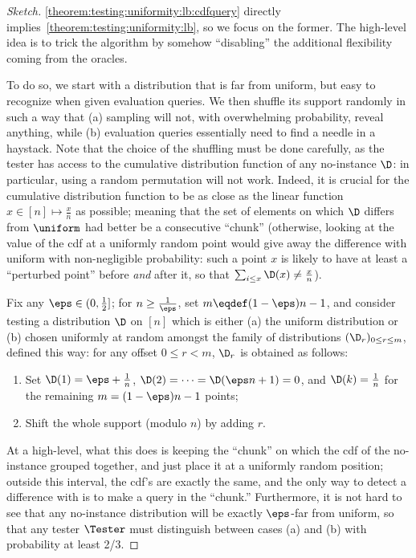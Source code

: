 \begin{proof}[Sketch]
\cref{theorem:testing:uniformity:lb:cdfquery} directly implies~\cref{theorem:testing:uniformity:lb}, so we focus on the former. The high-level idea is to trick the algorithm by somehow ``disabling'' the additional flexibility coming from the oracles.

To do so, we start with a distribution that is far from uniform, but easy to recognize when given evaluation queries. We then shuffle its support randomly in such a way that \textsf{(a)} sampling will not, with overwhelming probability, reveal anything, while \textsf{(b)} evaluation queries essentially need to find a needle in a haystack. Note that the choice of the shuffling must be done carefully, as the tester has access to the cumulative distribution function of any \textsf{no}-instance $\D$: in particular, using a random permutation will not work. Indeed, it is crucial for the cumulative distribution function to be as close as the linear function $x\in[n] \mapsto \frac{x}{n}$ as possible; meaning that the set of elements on which $\D$ differs from $\uniform$ had better be a consecutive ``chunk'' (otherwise, looking at the value of the cdf at a uniformly random point would give away the difference with uniform with non-negligible probability: such a point $x$ is likely to have at least a ``perturbed point'' before \emph{and} after it, so that $\sum_{i \leq x} \D(x)\neq \frac{x}{n}$).

Fix any $\eps\in(0,\frac{1}{2}]$; for $n\geq \frac{1}{\eps}$, set $m\eqdef(1-\eps)n-1$, and consider testing a distribution $\D$ on $[n]$ which is either \textsf{(a)} the uniform distribution or \textsf{(b)} chosen uniformly at random amongst the family of distributions $(\D_r)_{0\leq r \leq m}$, defined this way: for any offset $0\leq r < m$, $\D_r$ is obtained as follows:\begin{enumerate}
  \item Set $\D(1)=\eps+\frac{1}{n}$, $\D(2)=\dots=\D(\eps n+1)=0$, and $\D(k)=\frac{1}{n}$ for the remaining $m=(1-\eps)n-1$ points;
  \item Shift the whole support (modulo $n$) by adding $r$.
\end{enumerate}
At a high-level, what this does is keeping the ``chunk'' on which the cdf of the \textsf{no}-instance grouped together, and just place it at a uniformly random position; outside this interval, the cdf's are exactly the same, and the only way to detect a difference with \CDFEVAL is to make a query in the ``chunk.'' Furthermore, it is not hard to see that any \textsf{no}-instance distribution will be exactly $\eps$-far from uniform, so that any tester $\Tester$ must distinguish between cases \textsf{(a)} and \textsf{(b)} with probability at least 2/3.\medskip


\end{proof}
